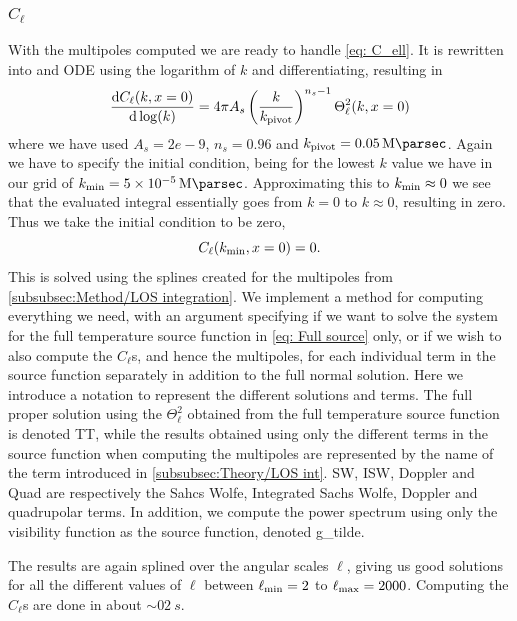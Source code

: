 \documentclass[10pt,a4paper]{article}
\begin{document}
\subsubsection{\texorpdfstring{$C_\ell$}{Cell}}
\label{subsubsec:Method/C_ell}
With the multipoles computed we are ready to handle \cref{eq: C_ell}. It is rewritten into and ODE using the logarithm of $k$ and differentiating, resulting in
\begin{equation}
  \dv{C_\ell(k,x=0)}{\log(k)} = 4\pi A_s \left(\frac{k}{k_{\rm{pivot}}}\right)^{n_s-1} \Theta_\ell^2(k,x=0)
  \label{eq: Cell ODE}
\end{equation}
where we have used $A_s = 2e-9$, $n_s = 0.96$ and $k_{\rm{pivot}} = \SI{0.05}{\per\mega\parsec}$. Again we have to specify the initial condition, being for the lowest $k$ value we have in our grid of $k_{\rm{min}} = \SI{5e-5}{\per\mega\parsec}$. Approximating this to $k_{\rm{min}} \approx 0$ we see that the evaluated integral essentially goes from $k=0$ to $k\approx0$, resulting in zero. Thus we take the initial condition to be zero,
\begin{equation*}
  C_\ell(k_{\rm{min}},x=0) =0.
\end{equation*}
This is solved using the splines created for the multipoles from \cref{subsubsec:Method/LOS integration}. We implement a method for computing everything we need, with an argument specifying if we want to solve the system for the full temperature source function in \cref{eq: Full source} only, or if we wish to also compute the $C_\ell$s, and hence the multipoles, for each individual term in the source function separately in addition to the full normal solution. Here we introduce a notation to represent the different solutions and terms. The full proper solution using the $\Theta_\ell^2$ obtained from the full temperature source function is denoted \rm{TT}, while the results obtained using only the different terms in the source function when computing the multipoles are represented by the name of the term introduced in \cref{subsubsec:Theory/LOS int}. \rm{SW}, \rm{ISW}, \rm{Doppler} and \rm{Quad} are respectively the Sahcs Wolfe, Integrated Sachs Wolfe, Doppler and quadrupolar terms. In addition, we compute the power spectrum using only the visibility function as the source function, denoted \rm{g\_tilde}.

The results are again splined over the angular scales $\ell$, giving us good solutions for all the different values of $\ell$ between $\ell_{\rm{min}}=2$ to $\ell_{\rm{max}}=2000$. Computing the $C_\ell$s are done in about $\sim\SI{02}{s}$.
\end{document}
